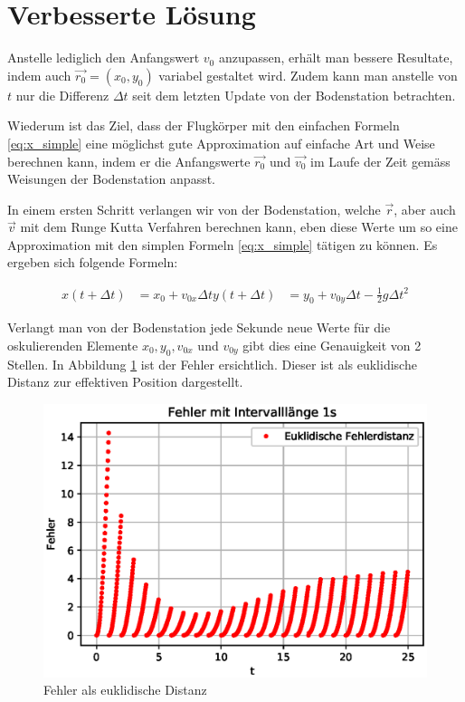 \section{Verbesserte Lösung
\label{perturbation:section:verbesserte_loesung}}

Anstelle lediglich den Anfangswert $v_0$ anzupassen, erhält man bessere Resultate, indem auch $\vec{r_0} = (x_0, y_0)$ variabel gestaltet wird. 
Zudem kann man anstelle von $t$ nur die Differenz $\Delta t$ seit dem letzten Update von der Bodenstation betrachten.

Wiederum ist das Ziel, dass der Flugkörper mit den einfachen Formeln \eqref{eq:x_simple} eine möglichst gute Approximation auf einfache Art und Weise berechnen kann, indem er die Anfangswerte $\vec{r_0}$ und $\vec{v_0}$ im Laufe der Zeit gemäss Weisungen der Bodenstation anpasst.

In einem ersten Schritt verlangen wir von der Bodenstation, welche $\vec{r}$, aber auch $\vec{v}$ mit dem Runge Kutta Verfahren berechnen kann, eben diese Werte um so eine Approximation mit den simplen Formeln \eqref{eq:x_simple} tätigen zu können. Es ergeben sich folgende Formeln:

\begin{equation}
\begin{aligned}
x(t + \Delta t) &= x_0 + v_{0x}\Delta t
y(t + \Delta t) &= y_0 + v_{0y}\Delta t - \frac{1}{2}g\Delta t^2
\end{aligned}
\end{equation}

Verlangt man von der Bodenstation jede Sekunde neue Werte für die oskulierenden Elemente $x_0, y_0, v_{0x}$ und $v_{0y}$ gibt dies eine Genauigkeit von 2 Stellen. In Abbildung \ref{error} ist der Fehler ersichtlich. Dieser ist als euklidische Distanz zur effektiven Position dargestellt.

\begin{figure}
    \centering
    \includegraphics[scale = 0.7]{papers/perturbation/bilder/perturbation_fig3.eps}
    \caption{Fehler als euklidische Distanz}
	\label{error}
\end{figure}